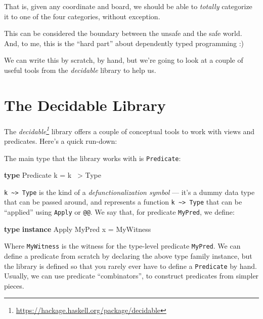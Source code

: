 \documentclass[]{article}
\newenvironment{Shaded}{}{}
\newcommand{\DataTypeTok}[1]{\textcolor[rgb]{0.56,0.13,0.00}{#1}}
\newcommand{\FunctionTok}[1]{\textcolor[rgb]{0.02,0.16,0.49}{#1}}
\newcommand{\KeywordTok}[1]{\textcolor[rgb]{0.00,0.44,0.13}{\textbf{#1}}}
\newcommand{\NormalTok}[1]{#1}
\renewcommand{\href}[2]{#2\footnote{\url{#1}}}
\begin{document}
That is, given any coordinate and board, we should be able to \emph{totally}
categorize it to one of the four categories, without exception.

This can be considered the boundary between the unsafe and the safe world. And,
to me, this is the ``hard part'' about dependently typed programming :)

We can write this by scratch, by hand, but we're going to look at a couple of
useful tools from the \emph{decidable} library to help us.

\hypertarget{the-decidable-library}{%
\section{The Decidable Library}\label{the-decidable-library}}

The \emph{\href{https://hackage.haskell.org/package/decidable}{decidable}}
library offers a couple of conceptual tools to work with views and predicates.
Here's a quick run-down:

The main type that the library works with is \texttt{Predicate}:

\begin{Shaded}
\begin{Highlighting}[]
\KeywordTok{type} \DataTypeTok{Predicate}\NormalTok{ k }\FunctionTok{=}\NormalTok{ k }\FunctionTok{~>} \DataTypeTok{Type}
\end{Highlighting}
\end{Shaded}

\texttt{k\ \textasciitilde{}\textgreater{}\ Type} is the kind of a
\emph{defunctionalization symbol} --- it's a dummy data type that can be passed
around, and represents a function
\texttt{k\ \textasciitilde{}\textgreater{}\ Type} that can be ``applied'' using
\texttt{Apply} or \texttt{@@}. We say that, for predicate \texttt{MyPred}, we
define:

\begin{Shaded}
\begin{Highlighting}[]
\KeywordTok{type} \KeywordTok{instance} \DataTypeTok{Apply} \DataTypeTok{MyPred}\NormalTok{ x }\FunctionTok{=} \DataTypeTok{MyWitness}
\end{Highlighting}
\end{Shaded}

Where \texttt{MyWitness} is the witness for the type-level predicate
\texttt{MyPred}. We can define a predicate from scratch by declaring the above
type family instance, but the library is defined so that you rarely ever have to
define a \texttt{Predicate} by hand. Usually, we can use predicate
``combinators'', to construct predicates from simpler pieces.
\end{document}
